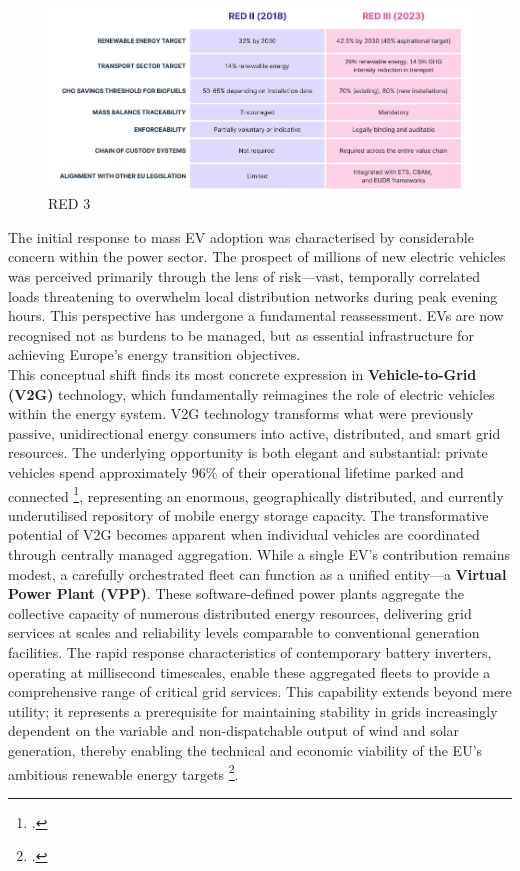 \begin{figure}[H]
    \centering
    \includegraphics[width=1\linewidth]{red.png}
    \caption{RED 3}
    \label{fig:placeholder}
\end{figure}
\noindent
The initial response to mass EV adoption was characterised by considerable concern within the power sector. The prospect of millions of new electric vehicles was perceived primarily through the lens of risk—vast, temporally correlated loads threatening to overwhelm local distribution networks during peak evening hours. This perspective has undergone a fundamental reassessment. EVs are now recognised not as burdens to be managed, but as essential infrastructure for achieving Europe's energy transition objectives. 
\\
This conceptual shift finds its most concrete expression in \textbf{Vehicle-to-Grid (V2G)} technology, which fundamentally reimagines the role of electric vehicles within the energy system.
\noindent
V2G technology transforms what were previously passive, unidirectional energy consumers into active, distributed, and smart grid resources. The underlying opportunity is both elegant and substantial: private vehicles spend approximately 96\% of their operational lifetime parked and connected \footcite{evertsson2024investigating}, representing an enormous, geographically distributed, and currently underutilised repository of mobile energy storage capacity.
\noindent
The transformative potential of V2G becomes apparent when individual vehicles are coordinated through centrally managed aggregation. While a single EV's contribution remains modest, a carefully orchestrated fleet can function as a unified entity—a \textbf{Virtual Power Plant (VPP)}. These software-defined power plants aggregate the collective capacity of numerous distributed energy resources, delivering grid services at scales and reliability levels comparable to conventional generation facilities. The rapid response characteristics of contemporary battery inverters, operating at millisecond timescales, enable these aggregated fleets to provide a comprehensive range of critical grid services. This capability extends beyond mere utility; it represents a prerequisite for maintaining stability in grids increasingly dependent on the variable and non-dispatchable output of wind and solar generation, thereby enabling the technical and economic viability of the EU's ambitious renewable energy targets \footcite{Tavakoli2019}.
